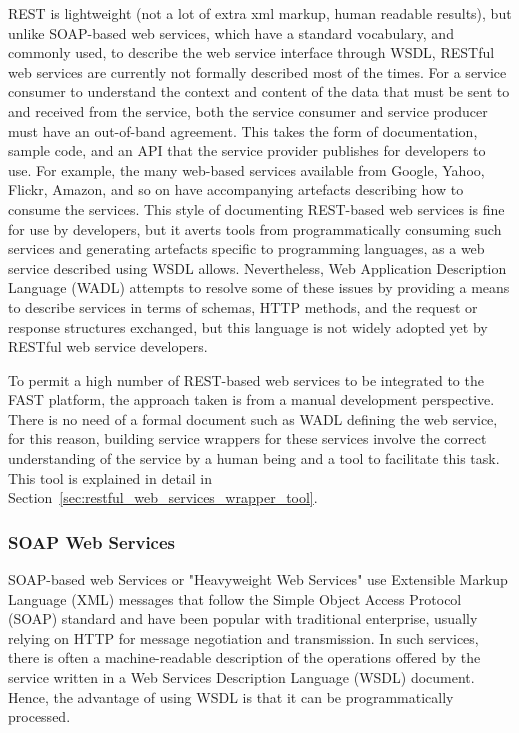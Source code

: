 \documentclass{fast_latex}
\begin{document}
REST is lightweight (not a lot of extra xml markup, human readable results), but unlike SOAP-based web services, which have a standard vocabulary, and commonly used, to describe the web service interface through WSDL, RESTful web services are currently not formally described most of the times. For a service consumer to understand the context and content of the data that must be sent to and received from the service, both the service consumer and service producer must have an out-of-band agreement. This takes the form of documentation, sample code, and an API that the service provider publishes for developers to use. For example, the many web-based services available from Google, Yahoo, Flickr, Amazon, and so on have accompanying artefacts describing how to consume the services. This style of documenting REST-based web services is fine for use by developers, but it averts tools from programmatically consuming such services and generating artefacts specific to programming languages, as a web service described using WSDL allows. Nevertheless, Web Application Description Language (WADL) attempts to resolve some of these issues by providing a means to describe services in terms of schemas, HTTP methods, and the request or response structures exchanged, but this language is not widely adopted yet by RESTful web service developers.

To permit a high number of REST-based web services to be integrated to the FAST platform, the approach taken is from a manual development perspective. There is no need of a formal document such as WADL defining the web service, for this reason, building service wrappers for these services involve the correct understanding of the service by a human being and a tool to facilitate this task. This tool is explained in detail in Section~\ref{sec:restful_web_services_wrapper_tool}.


\subsubsection{SOAP Web Services} %
\label{ssub:soap_web_services}

SOAP-based web Services or "Heavyweight Web Services" use Extensible Markup Language (XML) \cite{XML1.1} messages that follow the Simple Object Access Protocol (SOAP) standard \cite{SOAP1.2} and have been popular with traditional enterprise, usually relying on HTTP for message negotiation and transmission. In such services, there is often a machine-readable description of the operations offered by the service written in a Web Services Description Language (WSDL) document. Hence, the advantage of using WSDL is that it can be programmatically processed. 
\end{document}
